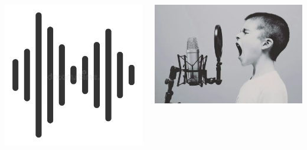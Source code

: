 \documentclass[aspectratio=169, 11pt]{beamer}
\begin{document}
\begin{frame}
\begin{columns}
\begin{column}{0.33\textwidth}
      \includegraphics[width=\textwidth]{image/audio.png}
    \end{column}
    \begin{column}{0.33\textwidth}
      \includegraphics[width=\textwidth]{image/audio3.png}
    \end{column}
  \end{columns}
\end{frame}
\end{document}
